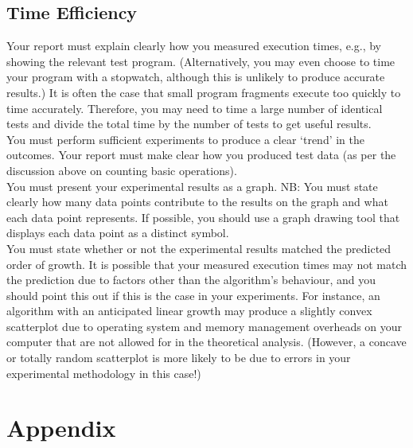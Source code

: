 \documentclass[]{article}
\begin{document}
\subsection{Time Efficiency}
Your report must explain clearly how you measured execution times, e.g., by showing the
relevant test program. (Alternatively, you may even choose to time your program with a
stopwatch, although this is unlikely to produce accurate results.) It is often the case that small
program fragments execute too quickly to time accurately. Therefore, you may need to time a
large number of identical tests and divide the total time by the number of tests to get useful
results.
\\
You must perform sufficient experiments to produce a clear ‘trend’ in the outcomes. Your
report must make clear how you produced test data (as per the discussion above on counting
basic operations).
\\
You must present your experimental results as a graph. NB: You must state clearly how many
data points contribute to the results on the graph and what each data point represents. If
possible, you should use a graph drawing tool that displays each data point as a distinct
symbol.
\\
You must state whether or not the experimental results matched the predicted order of growth.
It is possible that your measured execution times may not match the prediction due to factors
other than the algorithm’s behaviour, and you should point this out if this is the case in your
experiments. For instance, an algorithm with an anticipated linear growth may produce a
slightly convex scatterplot due to operating system and memory management overheads on
your computer that are not allowed for in the theoretical analysis. (However, a concave or
totally random scatterplot is more likely to be due to errors in your experimental methodology
in this case!)


\section{Appendix}



\end{document}
